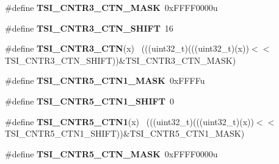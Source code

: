 \begin{DoxyCompactItemize}
\item 
\hypertarget{group___t_s_i___register___masks_ga706c452af2d87895eec6b24787418763}{}\#define {\bfseries T\+S\+I\+\_\+\+C\+N\+T\+R3\+\_\+\+C\+T\+N\+\_\+\+M\+A\+S\+K}~0x\+F\+F\+F\+F0000u\label{group___t_s_i___register___masks_ga706c452af2d87895eec6b24787418763}

\item 
\hypertarget{group___t_s_i___register___masks_ga7b5cdf80f7cb214a07cc1a08f84dafde}{}\#define {\bfseries T\+S\+I\+\_\+\+C\+N\+T\+R3\+\_\+\+C\+T\+N\+\_\+\+S\+H\+I\+F\+T}~16\label{group___t_s_i___register___masks_ga7b5cdf80f7cb214a07cc1a08f84dafde}

\item 
\hypertarget{group___t_s_i___register___masks_ga820fd10f31f0e10f48840243bbc1fe68}{}\#define {\bfseries T\+S\+I\+\_\+\+C\+N\+T\+R3\+\_\+\+C\+T\+N}(x)                                              ~(((uint32\+\_\+t)(((uint32\+\_\+t)(x))$<$$<$T\+S\+I\+\_\+\+C\+N\+T\+R3\+\_\+\+C\+T\+N\+\_\+\+S\+H\+I\+F\+T))\&T\+S\+I\+\_\+\+C\+N\+T\+R3\+\_\+\+C\+T\+N\+\_\+\+M\+A\+S\+K)\label{group___t_s_i___register___masks_ga820fd10f31f0e10f48840243bbc1fe68}

\item 
\hypertarget{group___t_s_i___register___masks_ga7c016e770c1a5682417e7f7df4887663}{}\#define {\bfseries T\+S\+I\+\_\+\+C\+N\+T\+R5\+\_\+\+C\+T\+N1\+\_\+\+M\+A\+S\+K}~0x\+F\+F\+F\+Fu\label{group___t_s_i___register___masks_ga7c016e770c1a5682417e7f7df4887663}

\item 
\hypertarget{group___t_s_i___register___masks_ga1aa3ace6f56df71e799b8c737559e2ab}{}\#define {\bfseries T\+S\+I\+\_\+\+C\+N\+T\+R5\+\_\+\+C\+T\+N1\+\_\+\+S\+H\+I\+F\+T}~0\label{group___t_s_i___register___masks_ga1aa3ace6f56df71e799b8c737559e2ab}

\item 
\hypertarget{group___t_s_i___register___masks_ga80141145e6a5e1ff736afd93146f5af2}{}\#define {\bfseries T\+S\+I\+\_\+\+C\+N\+T\+R5\+\_\+\+C\+T\+N1}(x)                                            ~(((uint32\+\_\+t)(((uint32\+\_\+t)(x))$<$$<$T\+S\+I\+\_\+\+C\+N\+T\+R5\+\_\+\+C\+T\+N1\+\_\+\+S\+H\+I\+F\+T))\&T\+S\+I\+\_\+\+C\+N\+T\+R5\+\_\+\+C\+T\+N1\+\_\+\+M\+A\+S\+K)\label{group___t_s_i___register___masks_ga80141145e6a5e1ff736afd93146f5af2}

\item 
\hypertarget{group___t_s_i___register___masks_gae1a4f3201c87c0064e434db5a57974a5}{}\#define {\bfseries T\+S\+I\+\_\+\+C\+N\+T\+R5\+\_\+\+C\+T\+N\+\_\+\+M\+A\+S\+K}~0x\+F\+F\+F\+F0000u\label{group___t_s_i___register___masks_gae1a4f3201c87c0064e434db5a57974a5}


\end{DoxyCompactItemize}
